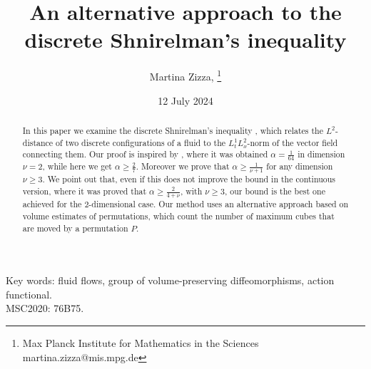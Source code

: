 \documentclass[12 pt]{article}
\title{An alternative approach to the discrete Shnirelman's inequality}
\author{Martina Zizza, \footnote{Max Planck Institute for Mathematics in the Sciences\\
\noindent 
martina.zizza@mis.mpg.de}}
\date{12 July 2024}
\theoremstyle{definition} \newtheorem{definition}{Definition}[section]
\theoremstyle{definition} \newtheorem{remark}[definition]{Remark}
\theoremstyle{plain} \newtheorem{lemma}[definition]{Lemma}
\theoremstyle{plain} \newtheorem{proposition}[definition]{Proposition}
\theoremstyle{plain} \newtheorem{theorem}[definition]{Theorem}
\theoremstyle{plain} \newtheorem{corollary}[definition]{Corollary}
\theoremstyle{definition} \newtheorem{example}[definition]{Example}
\theoremstyle{definition} \newtheorem{assumption}[definition]{Assumption}
\theoremstyle{definition} \newtheorem{conjecture}[definition]{Conjecture}
\newcommand{\1}{\mathbbm 1}
\numberwithin{equation}{section}
\begin{document}
\maketitle
\begin{abstract}
  In this paper we examine the discrete Shnirelman's inequality \cite{Shnirelman}, which relates the $L^2$-distance of two discrete configurations of a fluid to the $L^1_tL^2_x$-norm of the vector field connecting them. Our proof is inspired by \cite{Shnirelman}, where it was obtained $\alpha=\frac{1}{64}$ in dimension $\nu=2$, while here we get $\alpha\geq\frac{2}{7}$. Moreover we prove that $\alpha\geq\frac{1}{\nu+1}$ for any dimension $\nu\geq 3$. We point out that, even if this does not improve the bound in the continuous version, where it was proved that $\alpha\geq\frac{2}{4+\nu}$, with $\nu\geq 3$, our bound is the best one achieved for the $2$-dimensional case.   Our method uses an alternative approach based on volume estimates of permutations, which count the number of maximum cubes that are moved by a permutation $P$. 
\end{abstract}
\medskip

\noindent Key words: fluid flows, group of volume-preserving diffeomorphisms, action functional. \\

\noindent MSC2020: 76B75.
\end{document}
